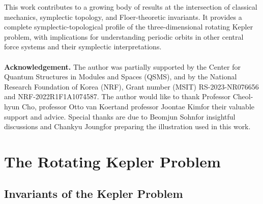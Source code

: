 \documentclass{amsart}
\begin{document}
This work contributes to a growing body of results at the intersection of classical mechanics, symplectic topology, and Floer-theoretic invariants. It provides a complete symplectic-topological profile of the three-dimensional rotating Kepler problem, with implications for understanding periodic orbits in other central force systems and their symplectic interpretations.\\
~~\\
\textbf{Acknowledgement.} The author was partially supported by the Center for Quantum Structures in Modules and Spaces (QSMS), and by the National Research Foundation of Korea (NRF), Grant number (MSIT) RS-2023-NR076656 and NRF-2022R1F1A1074587.
The author would like to thank Professor Cheol-hyun Cho\footnotemark[1], professor Otto van Koert\footnotemark[1] and professor Joontae Kim\footnotemark[2] for their valuable support and advice.
Special thanks are due to Beomjun Sohn\footnotemark[1] for insightful discussions and Chankyu Joung\footnotemark[1] for preparing the illustration used in this work.


\section{The Rotating Kepler Problem}

\subsection{Invariants of the Kepler Problem}\label{Subsection - Invariants}
\end{document}
